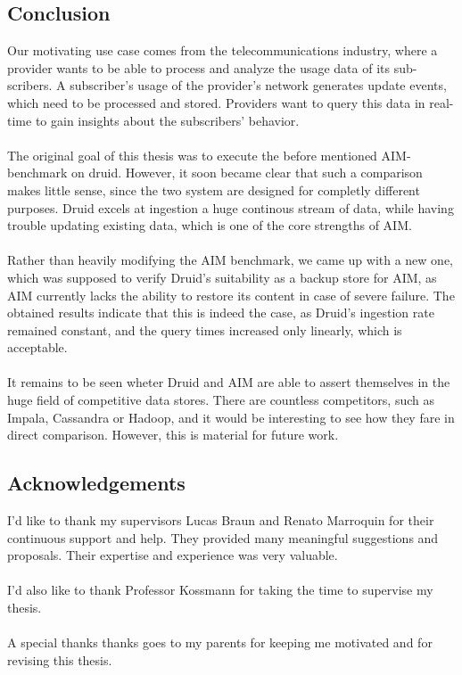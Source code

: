 \documentclass[11pt,singlecolumn]{scrartcl}
\begin{document}
\subsection{Conclusion}
Our motivating use case comes from the telecommunications industry, where
a provider wants to be able to process and analyze the usage data of its sub-
scribers. A subscriber's usage of the provider's network generates update events,
which need to be processed and stored. Providers want to query this data in
real-time to gain insights about the subscribers' behavior.\\\\
The original goal of this thesis was to execute the before mentioned AIM-benchmark on druid. However, it soon became clear that such a comparison makes little sense, since the two system are designed for completly different purposes. Druid excels at ingestion a huge continous stream of data, while having trouble updating existing data, which is one of the core strengths of AIM.\\\\
Rather than heavily modifying the AIM benchmark, we came up with a new one, which was supposed to verify Druid's suitability as a backup store for AIM, as AIM currently lacks the ability to restore its content in case of severe failure. The obtained results indicate that this is indeed the case, as Druid's ingestion rate remained constant, and the query times increased only linearly, which is acceptable.\\\\
It remains to be seen wheter Druid and AIM are able to assert themselves in the huge field of competitive data stores. There are countless competitors, such as Impala, Cassandra or Hadoop, and it would be interesting to see how they fare in direct comparison. However, this is material for future work.

\subsection{Acknowledgements}
I'd like to thank my supervisors Lucas Braun and Renato Marroquin for their continuous support and help. They provided many meaningful suggestions and proposals. Their expertise and experience was very valuable.\\\\
I'd also like to thank Professor Kossmann for taking the time to supervise my thesis.\\\\
A special thanks thanks goes to my parents for keeping me motivated and for revising this thesis.
\end{document}
